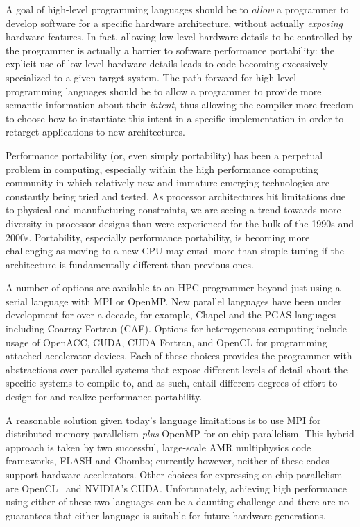 A goal of high-level programming languages should be to \emph{allow} a programmer to
develop software for a specific hardware architecture, without actually \emph{exposing} hardware
features.  In fact, allowing low-level hardware details to be controlled by the programmer is actually
a barrier to software performance portability: the explicit use of low-level hardware details 
leads to code becoming excessively specialized to a given target system.  The path forward for high-level
programming languages should be to allow a programmer to provide more semantic information
about their \emph{intent}, thus allowing the compiler more freedom to choose how to instantiate this
intent in a specific implementation in order to retarget applications to new architectures.

Performance portability (or, even simply portability) has been a perpetual problem in computing,
especially within the high performance computing community in which relatively new and immature
emerging technologies are constantly being tried and tested.  As processor architectures hit limitations due
to physical and manufacturing constraints, we are seeing a trend towards more diversity in
processor designs than were experienced for the bulk of the 1990s and 2000s.  Portability, especially
performance portability, is becoming more challenging as moving to a new CPU may entail more than simple
tuning if the architecture is fundamentally different than previous ones.

A number of options are available to an HPC programmer beyond just using a serial
language with MPI or OpenMP.  New parallel languages have been under development for over a decade, 
for example, Chapel and the PGAS languages including Coarray Fortran (CAF).  Options for 
heterogeneous computing
include usage of OpenACC, CUDA, CUDA Fortran, and OpenCL for programming attached
accelerator devices.  Each of these choices provides the programmer with abstractions over parallel
systems that expose different levels of detail about the specific systems to compile to, and as such,
entail different degrees of effort to design for and realize performance portability.

A reasonable solution given today's language limitations is to use MPI for distributed memory
parallelism \emph{plus} OpenMP for on-chip parallelism.  This hybrid approach is taken by two
successful, large-scale AMR multiphysics code frameworks, FLASH and Chombo; currently however,
neither of these codes support hardware accelerators\cite{DBLP:journals/corr/DubeyS13}.
Other choices for expressing on-chip parallelism are OpenCL~\cite{opencl11} and NVIDIA's CUDA.
Unfortunately, achieving high performance using either of these two languages can be a daunting
challenge and there are no guarantees that either language is suitable for future hardware
generations.  

